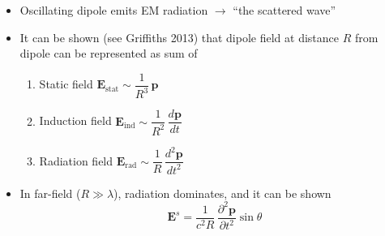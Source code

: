 \documentclass[11pt, oneside]{article}
\begin{document}
\begin{itemize}
\begin{itemize}
		\item[--] Oscillating dipole emits EM radiation $\rightarrow$ ``the scattered wave''
		\item[--] It can be shown (see Griffiths 2013) that dipole field at distance $R$ from dipole can be represented as sum of
		\begin{enumerate}
			\item[1)] Static field $\mathbf{E}_\mathrm{stat} \sim \dfrac{1}{R^3}\,\mathbf{p}$
			\item[2)] Induction field $\mathbf{E}_\mathrm{ind} \sim \dfrac{1}{R^2}\,\dfrac{d\mathbf{p}}{dt}$
			\item[3)] Radiation field $\mathbf{E}_\mathrm{rad} \sim \dfrac{1}{R}\,\dfrac{d^2\mathbf{p}}{dt^2}$
		\end{enumerate}
		\item[--] In far-field ($R \gg \lambda$), radiation dominates, and it can be shown
		\begin{equation}
			\label{e:Efar}
			\mathbf{E}^s = \frac{1}{c^2R}\,\frac{\partial^2\mathbf{p}}{\partial t^2}\sin\theta

\end{equation}
\end{itemize}
\end{itemize}
\end{document}
